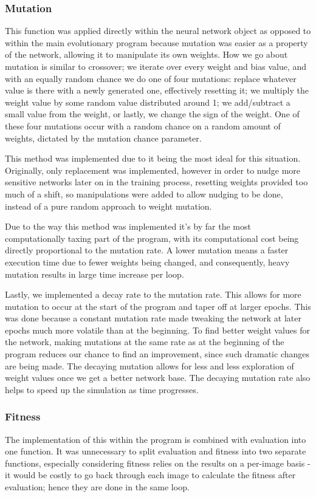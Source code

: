 \documentclass[12pt]{report}
\begin{document}
\subsubsection*{Mutation}
This function was applied directly within the neural network object as opposed to
within the main evolutionary program because mutation was easier as a property of
the network, allowing it to manipulate its own weights. How we go about
mutation is similar to crossover; we iterate over every
weight and bias value, and with an equally random chance we do one of four
mutations: replace whatever value is there with a newly generated one, effectively 
resetting it; we multiply the weight value by some random value distributed around 1;
we add/subtract a small value from the weight, or lastly, we change the sign of the
weight. One of these four mutations occur with a random chance on a random
amount of weights, dictated by the mutation chance parameter. 
\par This method was implemented due to it being the most ideal for this situation.
Originally, only replacement was implemented, however in order to nudge more sensitive
networks later on in the training process, resetting weights provided too much of a
shift, so manipulations were added to allow nudging to be done, instead of a
pure random approach to weight mutation. 
\par Due to the way this method was implemented it's by far the most computationally
taxing part of the program, with its computational cost being directly proportional
to the mutation rate. A lower mutation means a faster execution time due to fewer
weights being changed, and consequently, heavy mutation results in large time increase
per loop. 
\par Lastly, we implemented a decay rate to the mutation rate. This allows for more
mutation to occur at the start of the program and taper off at larger epochs. This
was done because a constant mutation rate made tweaking the network at later epochs
much more volatile than at the beginning. To find better weight values for the network,
making mutations at the same rate as at the beginning of the program reduces our chance
to find an improvement, since such dramatic changes are being made. The decaying mutation
allows for less and less exploration of weight values once we get a better network base.
The decaying mutation rate also helps to speed up the simulation as time progresses.


\subsubsection*{Fitness}
The implementation of this within the program is combined with evaluation into one function.
It was unnecessary to split evaluation and fitness into two separate functions, especially
considering fitness relies on the results on a per-image basis - it would be costly
to go back through each image to calculate the fitness after evaluation; hence they are
done in the same loop.
\end{document}
